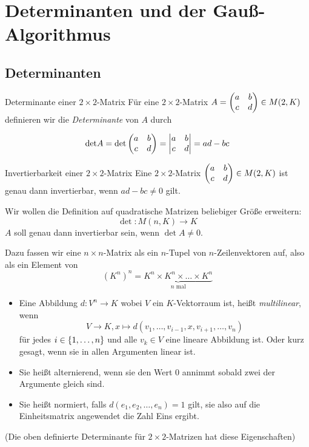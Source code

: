 \chapter{Determinanten und der Gauß-Algorithmus}
\section{Determinanten}
\begin{definition}{Determinante einer $2\times 2$-Matrix}
	Für eine $2\times2$-Matrix $A=\matrix{a & b\\c & d}\in M(2,K)$ definieren wir die \emph{Determinante} von $A$ durch

	\begin{equation*}
		\det A=\det\matrix{a & b\\c & d}=\detmatrix{a & b\\c & d}=ad-bc
	\end{equation*}
\end{definition}
\begin{satz}{Invertierbarkeit einer $2\times 2$-Matrix}
	Eine $2\times 2 $-Matrix $\matrix{a & b\\c & d}\in M(2,K)$ ist genau dann invertierbar, wenn $ad-bc\neq0$ gilt.
\end{satz}

Wir wollen die Definition auf quadratische Matrizen beliebiger Größe erweitern:
\begin{equation*}
	\det:M(n,K)\rightarrow K
\end{equation*}
$A$ soll genau dann invertierbar sein, wenn $\det A\neq 0$.

Dazu fassen wir eine $n\times n$-Matrix als ein $n$-Tupel von $n$-Zeilenvektoren auf, also als ein Element von
\begin{equation*}
	(K^n)^n= \underbrace{K^n\times K^n\times \ldots \times K^n}_{n\text{ mal}}
\end{equation*}

\begin{itemize}
	\item Eine Abbildung $d:V^n\rightarrow K$ wobei $V$ ein $K$-Vektorraum ist, heißt \emph{multilinear}, wenn
	\begin{equation*}
		V\rightarrow K, x\mapsto d(v_1,\ldots,v_{i-1},x,v_{i+1},\ldots,v_n)
	\end{equation*}
	für jedes $i\in\left\{ 1,\ldots, n \right\}$ und alle $v_k\in V$ eine lineare Abbildung ist. Oder kurz gesagt, wenn sie in allen Argumenten linear ist.
	\item Sie heißt alternierend, wenn sie den Wert $0$ annimmt sobald zwei der Argumente gleich sind.
	\item Sie heißt normiert, falls $d(e_1,e_2,\ldots, e_n)=1$ gilt, sie also auf die Einheitsmatrix angewendet die Zahl Eins ergibt.
\end{itemize}
(Die oben definierte Determinante für $2\times 2$-Matrizen hat diese Eigenschaften)

